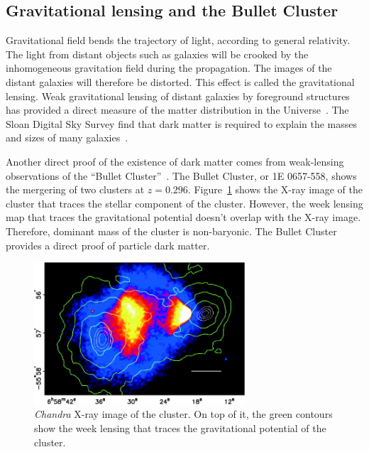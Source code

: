 \documentclass[doublespace,nopageskip]{VTthesis} %
\begin{document}
\subsection{Gravitational lensing and the Bullet Cluster}

Gravitational field bends the trajectory of light, according to general relativity. The light from distant objects such as galaxies will be crooked by the inhomogeneous gravitation field during the propagation. The images of the distant galaxies will therefore be distorted. This effect is called the gravitational lensing. Weak gravitational lensing of distant galaxies by foreground structures has provided a direct measure of the matter distribution in the Universe~\cite{2002NewAR..46..767H}. The Sloan Digital Sky Survey find that dark matter is required to explain the masses and sizes of many galaxies~\cite{2006ApJS..162...38A}.

Another direct proof of the existence of dark matter comes from weak-lensing observations of the ``Bullet Cluster''~\cite{2006ApJ...648L.109C}. The Bullet Cluster, or 1E 0657-558, shows the mergering of two clusters at $z=0.296$. Figure~\ref{fig:bullet} shows the X-ray image of the cluster that traces the stellar component of the cluster. However, the week lensing map that traces the gravitational potential doesn't overlap with the X-ray image. Therefore, dominant mass of the cluster is non-baryonic. The Bullet Cluster provides a direct proof of particle dark matter.

\begin{figure}[htb]
    \centering
    \includegraphics[width=0.7\textwidth]{Figures/Intro/bullet.jpg}
    \caption{\textit{Chandra} X-ray image of the cluster.  On top of it, the green contours show the week lensing that traces the gravitational potential of the cluster. }
    \label{fig:bullet}
\end{figure}
\end{document}
